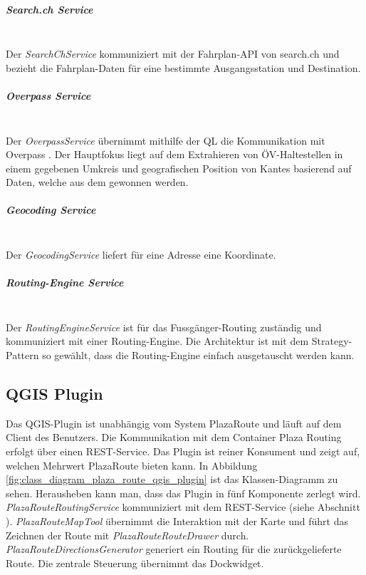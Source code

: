 \subparagraph{Search.ch Service}\label{architektur:Search.ch Service}~\\
Der \emph{SearchChService} kommuniziert mit der Fahrplan-\ac{API} von search.ch \cite{search_ch_route_api} und bezieht die Fahrplan-Daten für eine bestimmte Ausgangsstation und Destination.

\subparagraph{Overpass Service}\label{architektur:Overpass Service}~\\
Der \emph{OverpassService} übernimmt mithilfe der \ac{QL} die Kommunikation mit Overpass \cite{wiki:overpass}. Der Hauptfokus liegt auf dem Extrahieren von ÖV-Haltestellen in einem gegebenen Umkreis und geografischen Position von \glspl{Kante} basierend auf Daten, welche aus dem  gewonnen werden.

\subparagraph{Geocoding Service}\label{architektur:Geocoding Service}~\\
Der \emph{GeocodingService} liefert für eine Adresse eine Koordinate.

\subparagraph{Routing-Engine Service}\label{architektur:Routing-Engine Service}~\\
Der \emph{RoutingEngineService} ist für das Fussgänger-Routing zuständig und kommuniziert mit einer Routing-Engine. Die Architektur ist mit dem Strategy-Pattern \cite{gof_patterns} so gewählt, dass die Routing-Engine einfach ausgetauscht werden kann.

\subsection{QGIS Plugin}
\label{architektur:QGIS Plugin}

Das QGIS-Plugin ist unabhängig vom System PlazaRoute und läuft auf dem Client des Benutzers. Die Kommunikation mit dem Container Plaza Routing erfolgt über einen REST-Service. Das Plugin ist reiner Konsument und zeigt auf, welchen Mehrwert PlazaRoute bieten kann. In Abbildung \ref{fig:class_diagram_plaza_route_qgis_plugin} ist das Klassen-Diagramm zu sehen. Herausheben kann man, dass das Plugin in fünf Komponente zerlegt wird. \emph{PlazaRouteRoutingService} kommuniziert mit dem REST-Service (siehe Abschnitt ). \emph{PlazaRouteMapTool} übernimmt die Interaktion mit der Karte und führt das Zeichnen der Route mit \emph{PlazaRouteRouteDrawer} durch. \emph{PlazaRouteDirectionsGenerator} generiert ein Routing für die zurückgelieferte Route. Die zentrale Steuerung übernimmt das Dockwidget.

